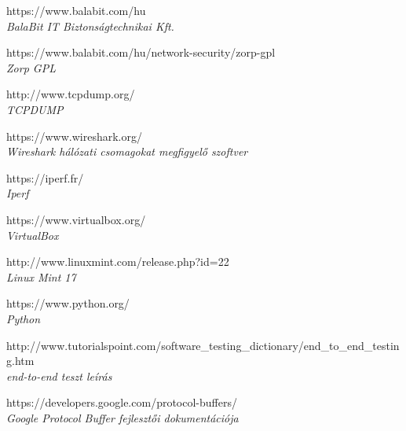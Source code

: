 \documentclass[a4paper,12pt,oneside]{report}
\begin{document}
\begin{thebibliography}{99}



		https://www.balabit.com/hu \\
        {\em BalaBit IT Biztonságtechnikai Kft. \\}     

		https://www.balabit.com/hu/network-security/zorp-gpl \\
        {\em Zorp GPL \\}     
           
		http://www.tcpdump.org/ \\
        {\em TCPDUMP \\}     
        
	 	https://www.wireshark.org/ \\
        {\em Wireshark hálózati csomagokat megfigyelő szoftver\\}         
        
		https://iperf.fr/ \\
        {\em Iperf \\}
        
		https://www.virtualbox.org/ \\
        {\em VirtualBox \\}
        
		http://www.linuxmint.com/release.php?id=22 \\
        {\em Linux Mint 17 \\}
        
		https://www.python.org/ \\
        {\em Python \\}

		http://www.tutorialspoint.com/software\_testing\_dictionary/end\_to\_end\_testing.htm \\
	{\em end-to-end teszt leírás \\}

		https://developers.google.com/protocol-buffers/ \\
	{\em Google Protocol Buffer fejlesztői dokumentációja \\}


\end{thebibliography}
\end{document}
